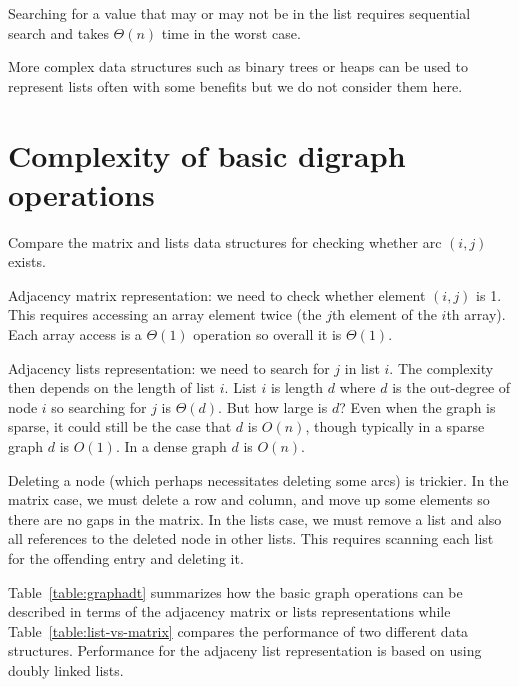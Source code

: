 Searching for  a value that may or may not be in the list requires sequential search
and takes $\Theta(n)$ time in the worst case. 

More complex data structures such as binary trees or heaps can be used to represent lists often with some benefits  but we do not consider them here. 

\section{Complexity of basic digraph operations}

\beginboxedexample
 Compare the matrix and lists data structures for checking whether arc $(i,j)$ exists.
 
Adjacency matrix representation: we need to check whether element $(i,j)$ is 1. This requires accessing
an array element twice (the $j$th element of the $i$th array). Each array access is a $\Theta(1)$ operation so overall it is $\Theta(1)$.

Adjacency lists representation: we need to search for $j$ in list $i$. The complexity then depends on the length of list $i$. List $i$ is length $d$ where $d$ is the out-degree of node $i$ so searching for $j$ is $\Theta(d)$. But how large is $d$? Even when the graph is sparse, it could still be the case that $d$ is $O(n)$, though typically in a sparse graph $d$ is $O(1)$.  In a dense graph $d$ is $O(n)$.
\endboxedexample{0cm}

\beginboxedexample
Deleting a node (which perhaps necessitates
deleting some arcs) is trickier. In the matrix case, we must delete
a row and column, and move up some elements so there are no gaps
in the matrix. In the lists case, we must remove a list and also
all references to the deleted node in other lists. This requires
scanning each list for the offending entry and deleting it.
\endboxedexample{0cm}
 
Table~\ref{table:graphadt} summarizes how the basic graph operations can be described in terms of the
adjacency matrix or lists representations while Table~\ref{table:list-vs-matrix} compares the performance of two
different data structures. Performance for the adjaceny list representation is based on using doubly linked lists.

